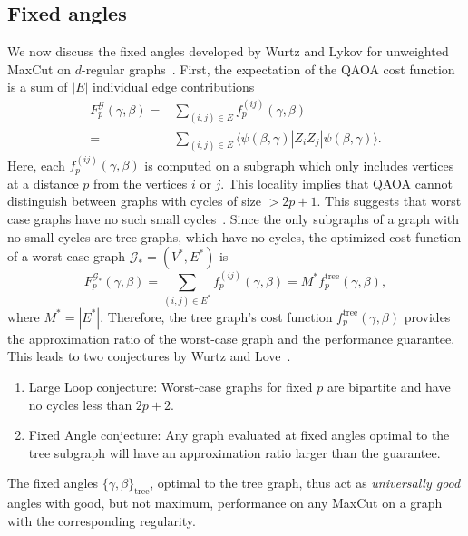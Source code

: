 \documentclass[twocolumn,
english,
aps,
pra,
10pt,
longbibliography,
superscriptaddress,
amsmath,
amssymb,
floatfix
]{revtex4-2}
\begin{document}
{\subsection{Fixed angles\label{app:fixed_angles}}

We now discuss the fixed angles developed by Wurtz and Lykov for unweighted MaxCut on $d$-regular graphs~\cite{Wurtz2021}. 
First, the expectation of the QAOA cost function is a sum of $|E|$ individual edge contributions
\begin{align}
    F_p^{\mathcal{G}}(\gamma,\beta)=&\sum_{(i,j)\in E}f^{(ij)}_p(\gamma,\beta)\\
    =&\sum_{(i,j)\in E}\langle\psi(\beta,\gamma) |Z_iZ_j|\psi(\beta,\gamma)\rangle.
\end{align}
Here, each $f^{(ij)}_p(\gamma,\beta)$ is computed on a subgraph which only includes vertices at a distance $p$ from the vertices $i$ or $j$. 
This locality implies that QAOA cannot distinguish between graphs with cycles of size $>2p+1$.
This suggests that worst case graphs have no such small cycles~\cite{Wurtz2021a}.
Since the only subgraphs of a graph with no small cycles are tree graphs, which have no cycles, the optimized cost function of a worst-case graph
$\mathcal{G}_*=(V^*,E^*)$ is
\begin{equation}
    F_p^{\mathcal{G}_*}(\gamma,\beta)=\sum_{(i,j)\in E^*}f^{(ij)}_p(\gamma,\beta)=M^*f^\text{tree}_p(\gamma,\beta),
\end{equation}
where $M^*=|E^*|$. 
Therefore, the tree graph's cost function $f^\text{tree}_p(\gamma,\beta)$ provides the approximation ratio of the worst-case graph and the performance guarantee. 
This leads to two conjectures by Wurtz and Love~\cite{Wurtz2021a}.
\begin{enumerate}
    \item Large Loop conjecture: Worst-case graphs for fixed $p$ are bipartite and have no cycles less than $2p + 2$.
    \item Fixed Angle conjecture: Any graph evaluated at fixed angles optimal to the tree subgraph will have an approximation ratio larger than the guarantee.
\end{enumerate}
The fixed angles $\{\gamma,\beta\}_\text{tree}$, optimal to the tree graph, thus act as \emph{universally good} angles with good, but not maximum, performance on any MaxCut on a graph with the corresponding regularity.

}
\end{document}
